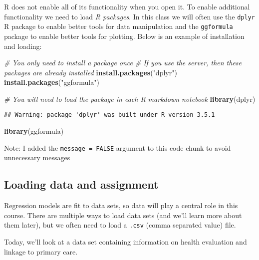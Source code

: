 \documentclass[]{article}
\newenvironment{Shaded}{\begin{snugshade}}{\end{snugshade}}
\newcommand{\KeywordTok}[1]{\textcolor[rgb]{0.13,0.29,0.53}{\textbf{#1}}}
\newcommand{\StringTok}[1]{\textcolor[rgb]{0.31,0.60,0.02}{#1}}
\newcommand{\CommentTok}[1]{\textcolor[rgb]{0.56,0.35,0.01}{\textit{#1}}}
\newcommand{\NormalTok}[1]{#1}
\begin{document}
R does not enable all of its functionality when you open it. To enable
additional functionality we need to load \emph{R packages}. In this
class we will often use the \texttt{dplyr} R package to enable better
tools for data manipulation and the \texttt{ggformula} package to enable
better tools for plotting. Below is an example of installation and
loading:

\begin{Shaded}
\begin{Highlighting}[]
\CommentTok{# You only need to install a package once}
\CommentTok{# If you use the server, then these packages are already installed}
\KeywordTok{install.packages}\NormalTok{(}\StringTok{"dplyr"}\NormalTok{)}
\KeywordTok{install.packages}\NormalTok{(}\StringTok{"ggformula"}\NormalTok{)}
\end{Highlighting}
\end{Shaded}

\begin{Shaded}
\begin{Highlighting}[]
\CommentTok{# You will need to load the package in each R markdown notebook}
\KeywordTok{library}\NormalTok{(dplyr)}
\end{Highlighting}
\end{Shaded}

\begin{verbatim}
## Warning: package 'dplyr' was built under R version 3.5.1
\end{verbatim}

\begin{Shaded}
\begin{Highlighting}[]
\KeywordTok{library}\NormalTok{(ggformula)}
\end{Highlighting}
\end{Shaded}

Note: I added the \texttt{message\ =\ FALSE} argument to this code chunk
to avoid unnecessary messages

\subsection{Loading data and
assignment}\label{loading-data-and-assignment}

Regression models are fit to data sets, so data will play a central role
in this course. There are multiple ways to load data sets (and we'll
learn more about them later), but we often need to load a \texttt{.csv}
(comma separated value) file.

Today, we'll look at a data set containing information on health
evaluation and linkage to primary care.
\end{document}

